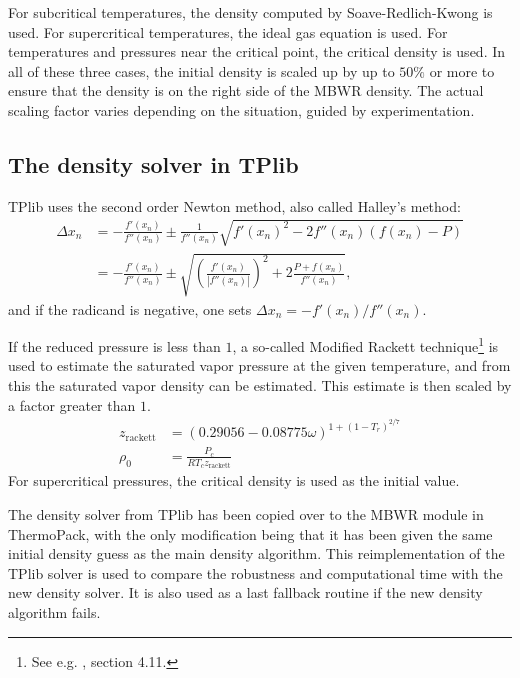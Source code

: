 \documentclass[internal,english]{sintefmemo2012}
\newcommand{\lp}{\left(}
\newcommand{\rp}{\right)}
\numberwithin{equation}{section}
\begin{document}
For subcritical temperatures, the density computed by
Soave-Redlich-Kwong is used. For supercritical temperatures, the ideal
gas equation is used. For temperatures and pressures near the critical
point, the critical density is used. In all of these three cases, the
initial density is scaled up by up to $50\%$ or more to ensure that the density is on the right side of the MBWR density. The actual scaling factor varies depending on the situation, guided by experimentation.

\subsection{The density solver in TPlib} \label{tplibSolver}
TPlib uses the second order Newton method, also called Halley's method:
\begin{align*}
  \Delta x_n &= -\frac{f'(x_n)}{f''(x_n)} \pm \frac{1}{f''(x_n)} \sqrt{ f'(x_n)^2 - 2 f''(x_n) (f(x_n)-P) } \\
  &= -\frac{f'(x_n)}{f''(x_n)} \pm \sqrt{ \lp \frac{f'(x_n)}{|f''(x_n)|}
    \rp^2 + 2 \frac{P+f(x_n)}{f''(x_n) } },
\end{align*}
and if the radicand is negative, one sets $\Delta x_n = -f'(x_n) /
f''(x_n)$. 

If the reduced pressure is less than $1$, a so-called Modified Rackett
technique\footnote{See e.g. \cite{GasesAndLiquids01}, section 4.11.} is used to estimate the saturated vapor pressure at the given
temperature, and from this the saturated vapor density can be
estimated. This estimate is then scaled by a factor greater than
$1$.
\begin{align*}
  z_{\mathrm{rackett}} &= (0.29056 - 0.08775\omega)^{1 + (1 - T_r)^{2/7}} \\
  \rho_0 &= \frac{P_c}{R T_c z_{\mathrm{rackett}}}
\end{align*}
For supercritical pressures, the critical density is used
as the initial value. 

The density solver from TPlib has been copied over to the MBWR module
in ThermoPack, with the only modification being that it has been given
the same initial density guess as the main density algorithm. This
reimplementation of the TPlib solver is used to compare the
robustness and computational time with the new density solver. It is
also used as a last fallback routine if the new density algorithm
fails.
\end{document}
